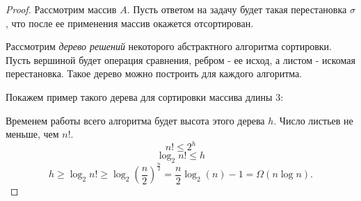 \documentclass[../book.tex]{subfiles}
\begin{document}
	
	\begin{proof}
		Рассмотрим массив $A$. Пусть ответом на задачу будет такая перестановка $\sigma$, что после ее применения массив окажется отсортирован.
		
		Рассмотрим \textit{дерево решений} некоторого абстрактного алгоритма сортировки. Пусть вершиной будет операция сравнения, ребром - ее исход, а листом - искомая перестановка. Такое дерево можно построить для каждого алгоритма. 
		
		Покажем пример такого дерева для сортировки массива длины 3:
				
				
			
				
			
			
				
				
				
				
				
		
		Временем работы всего алгоритма будет высота этого дерева $h$. Число листьев не меньше, чем $n!$.
		\[
		n! \leqslant 2^h
		\]
		\[
		\log_2n! \leqslant h
		\]
		\[
		h \geqslant \log_2n! \geqslant \log_2 \left(\frac{n}{2}\right)^{\frac{n}{2}} = \frac{n}{2} \log_2(n) - 1 = \Omega(n\log n).
		\]
	\end{proof}
	
	
	
	
	
	
	
	
	
	
	\pagebreak	
\end{document}
